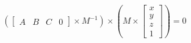 \documentclass{article}
\begin{document}
\thispagestyle{empty}

$$
\left( \begin{bmatrix}A & B & C & 0\end{bmatrix} \times M^{-1}\right)\times \left(M \times \begin{bmatrix}x \\ y \\ z\\1\end{bmatrix}\right)  = 0
$$
\end{document}
